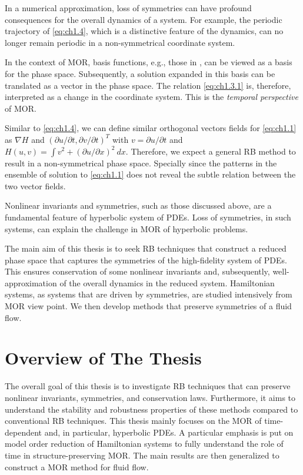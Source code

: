 In a numerical approximation, loss of symmetries can have profound consequences for the overall dynamics of a system. For example, the periodic trajectory of \eqref{eq:ch1.4}, which is a distinctive feature of the dynamics, can no longer remain periodic in a non-symmetrical coordinate system.

In the context of MOR, basis functions, e.g., those in , can be viewed as a basis for the phase space. Subsequently, a solution expanded in this basis can be translated as a vector in the phase space. The relation \eqref{eq:ch1.3.1} is, therefore, interpreted as a change in the coordinate system. This is the \emph{temporal perspective} of MOR.  

Similar to \eqref{eq:ch1.4}, we can define similar orthogonal vectors fields for \eqref{eq:ch1.1} as $\nabla H$ and $(\partial u/\partial t,\partial v/\partial t)^T$ with $v = \partial u/\partial t$ and $H(u,v) = \int v^2 + (\partial u / \partial x)^2 \ dx$. Therefore, we expect a general RB method to result in a non-symmetrical phase space. Specially since the patterns in the ensemble of solution to \eqref{eq:ch1.1} does not reveal the subtle relation between the two vector fields.

Nonlinear invariants and symmetries, such as those discussed above, are a fundamental feature of hyperbolic system of PDEs. Loss of symmetries, in such systems, can explain the challenge in MOR of hyperbolic problems.

The main aim of this thesis is to seek RB techniques that construct a reduced phase space that captures the symmetries of the high-fidelity system of PDEs. This ensures conservation of some nonlinear invariants and, subsequently, well-approximation of the overall dynamics in the reduced system. Hamiltonian systems, as systems that are driven by symmetries, are studied intensively from MOR view point. We then develop methods that preserve symmetries of a fluid flow.

\section{Overview of The Thesis}
The overall goal of this thesis is to investigate RB techniques that can preserve nonlinear invariants, symmetries, and conservation laws. Furthermore, it aims to understand the stability and robustness properties of these methods compared to conventional RB techniques. This thesis mainly focuses on the MOR of time-dependent and, in particular, hyperbolic PDEs. A particular emphasis is put on model order reduction of Hamiltonian systems to fully understand the role of time in structure-preserving MOR. The main results are then generalized to construct a MOR method for fluid flow.

